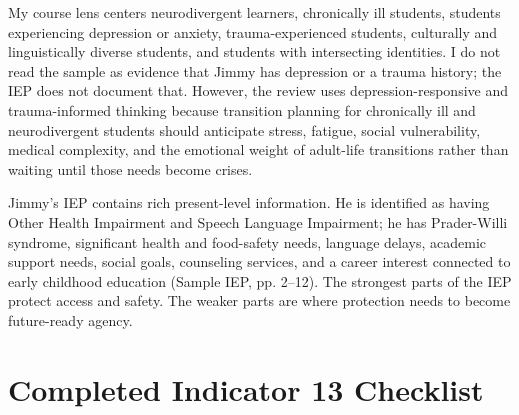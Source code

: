 \documentclass[11pt]{article}
\begin{document}
My course lens centers neurodivergent learners, chronically ill students, students experiencing depression or anxiety, trauma-experienced students, culturally and linguistically diverse students, and students with intersecting identities. I do not read the sample as evidence that Jimmy has depression or a trauma history; the IEP does not document that. However, the review uses depression-responsive and trauma-informed thinking because transition planning for chronically ill and neurodivergent students should anticipate stress, fatigue, social vulnerability, medical complexity, and the emotional weight of adult-life transitions rather than waiting until those needs become crises.

Jimmy's IEP contains rich present-level information. He is identified as having Other Health Impairment and Speech Language Impairment; he has Prader-Willi syndrome, significant health and food-safety needs, language delays, academic support needs, social goals, counseling services, and a career interest connected to early childhood education (Sample IEP, pp. 2--12). The strongest parts of the IEP protect access and safety. The weaker parts are where protection needs to become future-ready agency.

\section{Completed Indicator 13 Checklist}

\begin{center}
\end{center}
\end{document}
